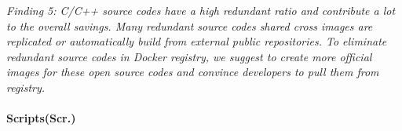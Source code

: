 \textit{Finding 5: C/C++ source codes have a high redundant ratio and contribute a lot to the overall savings. Many redundant source codes shared cross images are replicated or automatically build from external public repositories. To eliminate redundant source codes in Docker registry, we suggest to create more official images for these open source codes and convince developers to pull them from registry.}
%
%
%
%
%
%
\paragraph{Scripts(Scr.)}
%
%

